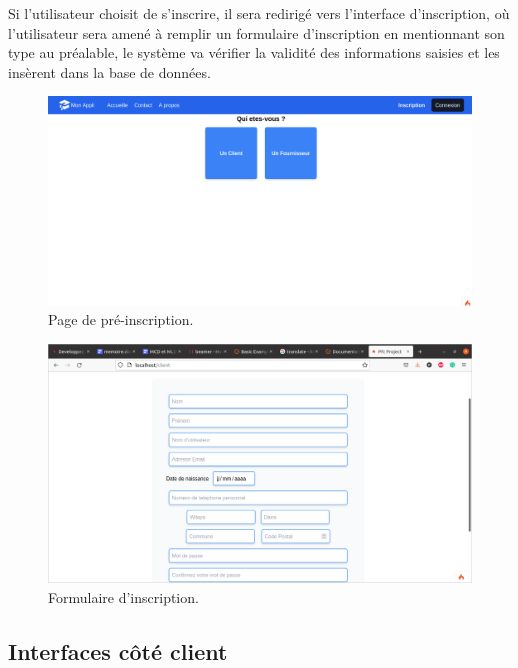 \documentclass[french]{report}
\begin{document}
            Si l'utilisateur choisit de s'inscrire, il sera redirigé vers l'interface
	    d'inscription, où l'utilisateur sera amené à remplir un formulaire d'inscription
	    en mentionnant son type au préalable, le système va vérifier la validité des informations
	    saisies et les insèrent dans la base de données.
            
            \begin{figure}[H]
                \centering
                \includegraphics[width=1\textwidth]{images/inscription.png}
                \caption{Page de pré-inscription.}
            \end{figure}
            
            \begin{figure}[H]
                \centering
                \includegraphics[width=1\textwidth]{images/formulaire.png}
                \caption{Formulaire d'inscription.}
            \end{figure}
            
            \subsection{Interfaces côté client}
            
\end{document}
